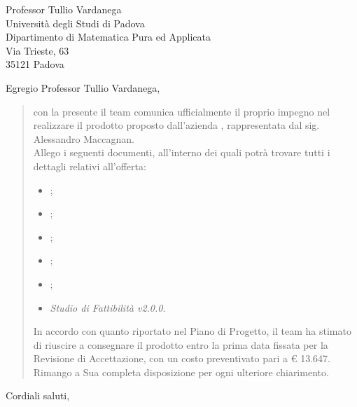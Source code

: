\date{Padova, 22 Gennaio 2016}
\begin{letter}{
	Professor Tullio Vardanega \\
	Università degli Studi di Padova \\
	Dipartimento di Matematica Pura ed Applicata \\
	Via Trieste, 63 \\
	35121 Padova
}
\signature{
\begin{center}
\textit{
\Responsabile{} \\
Responsabile \GroupName{}
}
\texttt{[image: res/MatteoDiPirro.png]}
\end{center}
}
\opening{Egregio Professor Tullio Vardanega,}
\begin{quotation}
con la presente il team \GroupName{} comunica ufficialmente il proprio impegno nel realizzare il prodotto \ProjectName{} proposto dall'azienda \Proponente, rappresentata dal sig. Alessandro Maccagnan. \\
Allego i seguenti documenti, all'interno dei quali potrà trovare tutti i dettagli relativi all'offerta:
\begin{itemize}
\item \AnalisiDeiRequisiti{};
\item \Glossario{};
\item \NormeDiProgetto{};
\item \PianoDiProgetto{};
\item \PianoDiQualifica{};
\item \textit{Studio di Fattibilità v2.0.0}.
\end{itemize}
In accordo con quanto riportato nel Piano di Progetto, il team ha stimato di riuscire a consegnare il prodotto entro la prima data fissata per la Revisione di Accettazione, con un costo preventivato pari a \euro{} 13.647. \\
Rimango a Sua completa disposizione per ogni ulteriore chiarimento.
\end{quotation}
\closing{Cordiali saluti,}
\end{letter}
